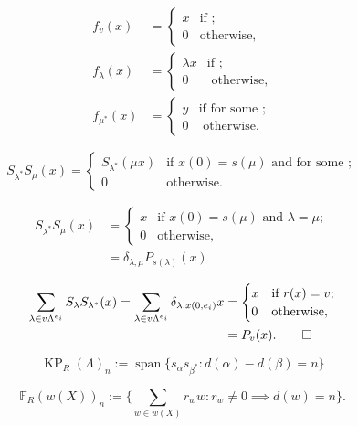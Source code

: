 \documentclass[a4paper,12pt]{article}
\begin{document}
\begin{align*} f_v(x)&=
     \begin{cases}
      x & \text{if ;}\\
      0 & \text{otherwise,}
     \end{cases}\\
f_\lambda(x)&=
     \begin{cases}
      \lambda x & \text{if ;}\\
      0 & \text{ otherwise,}
     \end{cases}\\
f_{\mu^{*}}(x)&=
     \begin{cases}
      y & \text{if  for some ;}\\
      0 & \text{ otherwise.}
     \end{cases}
\end{align*}

\begin{equation*}
 S_{\lambda^*}S_{\mu}(x) 
= \begin{cases}
     S_{\lambda^*}(\mu x) & \text{if } x(0)=s(\mu) \text{ and  for some }
;\\
0&\text{otherwise}.
   \end{cases}
\end{equation*}

\begin{align*}
 S_{\lambda^*}S_{\mu}(x) 
&= \begin{cases}
     x & \text{if } x(0)=s(\mu) \text{ and }
 \lambda = \mu;\\
0&\text{otherwise},
   \end{cases}
\\
&= \delta_{\lambda,\mu}P_{s(\lambda)}(x)
\end{align*}

\begin{align*}
 \sum_{\lambda \in v\Lambda^{e_i}}S_{\lambda} S_{\lambda^{*}} (x)
= \sum_{\lambda \in v\Lambda^{e_i}} \delta_{\lambda,x(0,e_i)}x
&= \begin{cases}
    x& \text{if } r(x) =v;\\
0&\text{otherwise},
   \end{cases}\\
&= P_v(x).\qedhere
\end{align*}

\[\operatorname{KP}_R(\Lambda)_n := {\operatorname{\mathrm{span}}}\{s_\alpha s_{\beta^{*}}: d(\alpha)-d(\beta)=n\}\]

\[{\mathbb{F}}_R(w(X))_n:=\Big\{ \sum_{w \in w(X)} r_w w: r_w \neq 0 \implies d(w)=n \Big\}.\]
\end{document}
